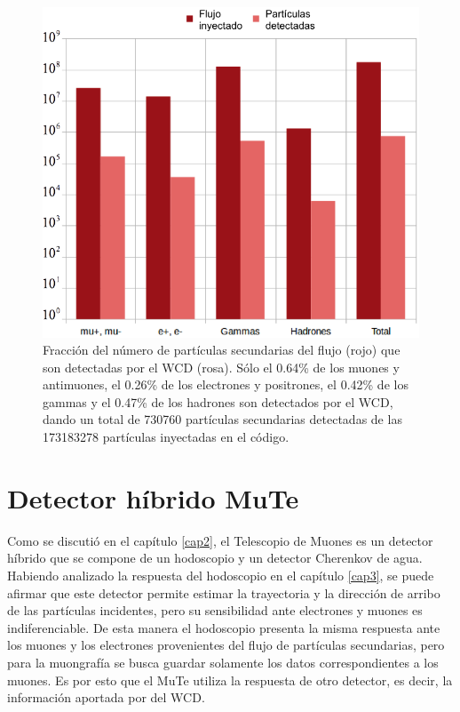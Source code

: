 \documentclass[12pt,oneside,openany,letter]{book}
\begin{document}
\begin{figure}[h]
\centering
\includegraphics[scale=0.6]{images/inyectadas_enelWCD.png}
\caption[Fracción del número de partículas secundarias del flujo que detecta el WCD]{Fracción del número de partículas secundarias del flujo (rojo) que son detectadas por el WCD (rosa). Sólo el 0.64\% de los muones y antimuones, el 0.26\% de los electrones y positrones, el 0.42\% de los gammas y el 0.47\% de los hadrones son detectados por el WCD, dando un total de 730760 partículas secundarias detectadas de las 173183278 partículas inyectadas en el código.
\label{inyectadas_enelWCD} }
\end{figure}



\chapter{Detector híbrido MuTe}\label{cap5}
Como se discutió en el capítulo \ref{cap2}, el Telescopio de Muones es un detector híbrido que se compone de un hodoscopio y un detector Cherenkov de agua. Habiendo analizado la respuesta del hodoscopio en el capítulo \ref{cap3}, se puede afirmar que este detector permite estimar la trayectoria y la dirección de arribo de las partículas incidentes, pero su sensibilidad ante electrones y muones es indiferenciable. De esta manera el hodoscopio presenta la misma respuesta ante los muones y los electrones provenientes del flujo de partículas secundarias, pero para la muongrafía se busca guardar solamente los datos correspondientes a los muones. Es por esto que el MuTe utiliza la respuesta de otro detector, es decir, la información aportada por del WCD. 
\end{document}
